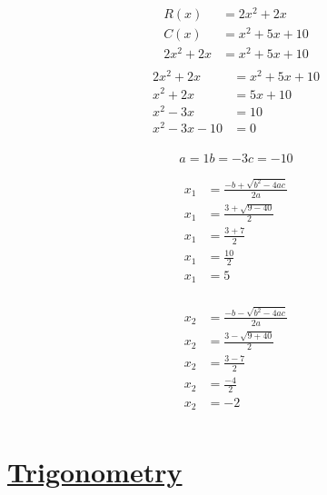 \documentclass{article}
\begin{document}
\begin{multicols}{2}
  \begin{align*}
    R(x) &= 2x^{2} + 2x\\
    C(x) &= x^{2} + 5x + 10\\
    2x^{2} + 2x &= x^{2} + 5x + 10\\
  \end{align*}
  \begin{align*}
    2x^{2} + 2x &= x^{2} + 5x + 10\\
    x^{2} + 2x &= 5x + 10\\
    x^{2} - 3x &= 10\\
    x^{2} -3x - 10 &= 0\\
  \end{align*}
\end{multicols}
\[  a = 1  b = -3  c = -10 \]
\begin{multicols}{2}
\begin{align*}
  x_{1} &= \frac{-b + \sqrt{b^{2} - 4ac}}{2a}\\
  x_{1} &= \frac{3 + \sqrt{9 - 40}}{2}\\
  x_{1} &= \frac{3 + 7}{2}\\
  x_{1} &= \frac{10}{2}\\
  x_{1} &= 5\\
\end{align*}

\begin{align*}
  x_{2} &= \frac{-b - \sqrt{b^{2} - 4ac}}{2a}\\
  x_{2} &= \frac{3 - \sqrt{9 + 40}}{2}\\
  x_{2} &= \frac{3 - 7}{2}\\
  x_{2} &= \frac{-4}{2}\\
  x_{2} &= -2\\
\end{align*}
\end{multicols}

\section{\underline{Trigonometry}}
\end{document}

